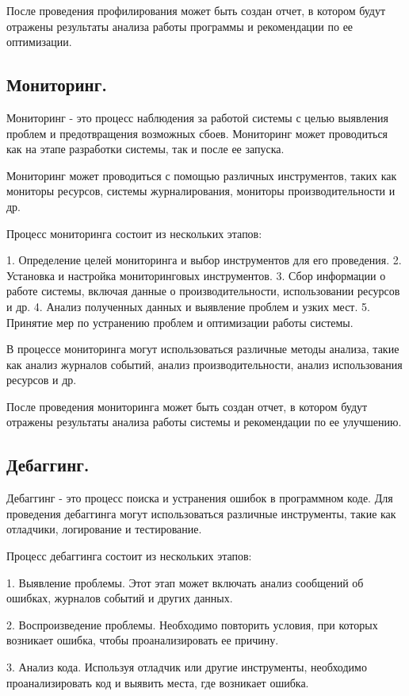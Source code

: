 \documentclass[utf8,14pt,a4paper,oneside,russian]{book}
\begin{document}
После проведения профилирования может быть создан отчет, в котором будут отражены результаты анализа работы программы и рекомендации по ее оптимизации.

\subsection{Мониторинг.}
Мониторинг - это процесс наблюдения за работой системы с целью выявления проблем и предотвращения возможных сбоев. Мониторинг может проводиться как на этапе разработки системы, так и после ее запуска.

Мониторинг может проводиться с помощью различных инструментов, таких как мониторы ресурсов, системы журналирования, мониторы производительности и др.

Процесс мониторинга состоит из нескольких этапов:

1. Определение целей мониторинга и выбор инструментов для его проведения.
2. Установка и настройка мониторинговых инструментов.
3. Сбор информации о работе системы, включая данные о производительности, использовании ресурсов и др.
4. Анализ полученных данных и выявление проблем и узких мест.
5. Принятие мер по устранению проблем и оптимизации работы системы.

В процессе мониторинга могут использоваться различные методы анализа, такие как анализ журналов событий, анализ производительности, анализ использования ресурсов и др.

После проведения мониторинга может быть создан отчет, в котором будут отражены результаты анализа работы системы и рекомендации по ее улучшению.

\subsection{Дебаггинг.}

Дебаггинг - это процесс поиска и устранения ошибок в программном коде. Для проведения дебаггинга могут использоваться различные инструменты, такие как отладчики, логирование и тестирование.

Процесс дебаггинга состоит из нескольких этапов:

1. Выявление проблемы. Этот этап может включать анализ сообщений об ошибках, журналов событий и других данных.

2. Воспроизведение проблемы. Необходимо повторить условия, при которых возникает ошибка, чтобы проанализировать ее причину.

3. Анализ кода. Используя отладчик или другие инструменты, необходимо проанализировать код и выявить места, где возникает ошибка.
\end{document}
